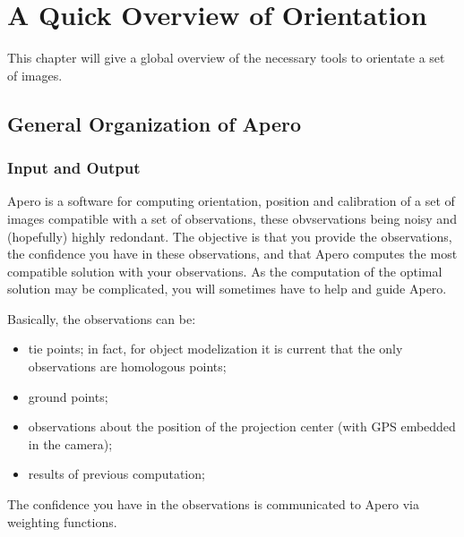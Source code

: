 \chapter{A Quick Overview of Orientation}

This chapter will give a global overview of the necessary tools 
to orientate a set of images.


\label{Intro:QuickApero}


\section{General Organization of Apero}

\subsection{Input and Output}

Apero is a software for computing orientation, position and calibration 
of a set of images compatible with a set of observations, these
obvservations being noisy and (hopefully) highly redondant.
The objective is that you provide the observations,
the confidence you have in these observations, and that
Apero computes the most compatible  solution with your
observations. As the computation of the
optimal solution may be complicated, you will sometimes
have to help and guide Apero.

Basically, the observations can be:

\begin{itemize}
    \item  tie points; in fact, for object modelization it is current that
           the only observations are homologous points;

    \item  ground points;

    \item  observations about the position of the projection center (with GPS embedded in the camera);

    \item  results of previous computation;

\end{itemize}

The confidence you have in the observations is communicated to Apero via weighting functions.

